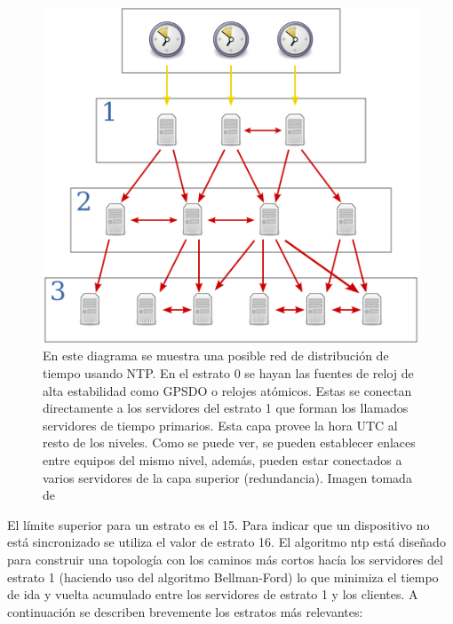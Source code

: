 \begin{figure}
	\centering
	\includegraphics[width=0.7\linewidth]{imagenes/ntp_tree}
	\caption[Esquema de una red de distribución de tiempo usando NTP.]{En este 
	diagrama se 
	muestra una posible red de distribución de tiempo usando NTP. En el estrato 
	0 se hayan las fuentes de reloj de alta estabilidad como GPSDO o relojes 
	atómicos. Estas se conectan directamente a los servidores del estrato 1 que 
	forman los llamados servidores de tiempo primarios. Esta capa provee la 
	hora UTC al resto de los niveles. Como se puede ver, se pueden establecer 
	enlaces entre equipos del mismo nivel, además, pueden estar conectados a 
	varios servidores de la capa superior (redundancia). Imagen tomada de 
	\cite{website:imgNTPtree}}
	\label{fig:ntptree}
\end{figure}


El límite superior para un estrato es el 15. Para indicar que un dispositivo no 
está sincronizado se utiliza el valor de estrato 16. El algoritmo \gls{ntp} 
está diseñado para construir una topología con los caminos más cortos hacía los 
servidores del estrato 1 (haciendo uso del algoritmo Bellman-Ford) lo que 
minimiza el tiempo de ida y vuelta acumulado entre los servidores de estrato 1 
y los clientes. A continuación se describen brevemente los estratos más 
relevantes:

